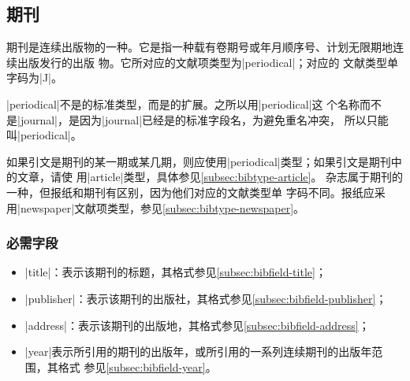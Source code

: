 
\subsection{期刊}\label{subsec:bibtype-periodical}

期刊是连续出版物的一种。它是指一种载有卷期号或年月顺序号、计划无限期地连续出版发行的出版
物\cite{gbt7714-2005}。它所对应的{\BibTeX}文献项类型为|periodical|；对应的
文献类型单字码为|J|\cite{gbt3469-1983}。

|periodical|不是{\BibTeX}的标准类型，而是{\njuthesis}的扩展。之所以用|periodical|这
个名称而不是|journal|，是因为|journal|已经是{\BibTeX}的标准字段名，为避免重名冲突，
所以只能叫|periodical|。

\begin{note}
如果引文是期刊的某一期或某几期，则应使用|periodical|类型；如果引文是期刊中的文章，请使
用|article|类型，具体参见\ref{subsec:bibtype-article}。
杂志属于期刊的一种，但报纸和期刊有区别，因为他们对应的文献类型单
字码不同。报纸应采用|newspaper|文献项类型，参见\ref{subsec:bibtype-newspaper}。
\end{note}

\subsubsection{必需字段}

\begin{itemize}
\item |title|：表示该期刊的标题，其格式参见\ref{subsec:bibfield-title}；
\item |publisher|：表示该期刊的出版社，其格式参见\ref{subsec:bibfield-publisher}；
\item |address|：表示该期刊的出版地，其格式参见\ref{subsec:bibfield-address}；
\item |year|表示所引用的期刊的出版年，或所引用的一系列连续期刊的出版年范围，其格式
  参见\ref{subsec:bibfield-year}。
\end{itemize}

